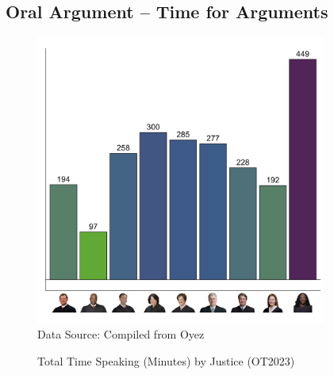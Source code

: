 \begin{landscape}
\subsection{\centering Oral Argument -- Time for Arguments}

\begin{figure}[H]
\centering
\caption{Total Time Speaking (Minutes) by Justice (OT2023)}
\includegraphics[width = 0.85\textwidth]{"Figures/statpack_figures/total_time_spoken_plot_OT23.png"} \\
\footnotesize{Data Source: Compiled from Oyez}
\end{figure}
\newpage



\end{landscape}
